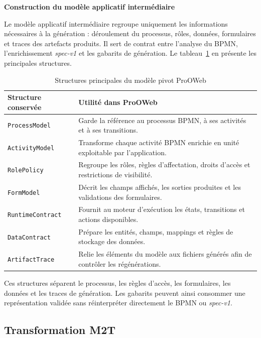 \textbf{Construction du modèle applicatif intermédiaire}

Le modèle applicatif intermédiaire regroupe uniquement les informations nécessaires à la génération : déroulement du processus, rôles, données, formulaires et traces des artefacts produits. Il sert de contrat entre l'analyse du BPMN, l'enrichissement \textit{spec-v1} et les gabarits de génération. Le tableau~\ref{tab:chap3-structures-modele-pivot} en présente les principales structures.

\begin{table}[H]
\centering
\caption{Structures principales du modèle pivot ProOWeb}
\label{tab:chap3-structures-modele-pivot}
\begin{tabularx}{\textwidth}{p{4.1cm}X}
\toprule
\textbf{Structure conservée} & \textbf{Utilité dans ProOWeb} \\
\midrule
\texttt{ProcessModel} & Garde la référence au processus BPMN, à ses activités et à ses transitions. \\
\texttt{ActivityModel} & Transforme chaque activité BPMN enrichie en unité exploitable par l'application. \\
\texttt{RolePolicy} & Regroupe les rôles, règles d'affectation, droits d'accès et restrictions de visibilité. \\
\texttt{FormModel} & Décrit les champs affichés, les sorties produites et les validations des formulaires. \\
\texttt{RuntimeContract} & Fournit au moteur d'exécution les états, transitions et actions disponibles. \\
\texttt{DataContract} & Prépare les entités, champs, mappings et règles de stockage des données. \\
\texttt{ArtifactTrace} & Relie les éléments du modèle aux fichiers générés afin de contrôler les régénérations. \\
\bottomrule
\end{tabularx}
\end{table}

Ces structures séparent le processus, les règles d'accès, les formulaires, les
données et les traces de génération. Les gabarits peuvent ainsi consommer une
représentation validée sans réinterpréter directement le BPMN ou
\textit{spec-v1}.

\subsection{Transformation M2T}

